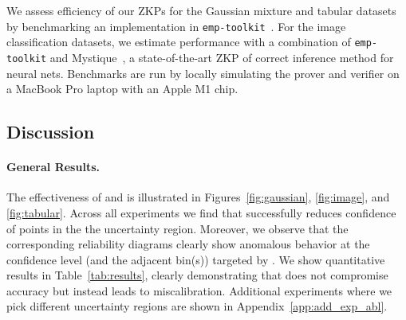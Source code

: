  We assess efficiency of our ZKPs for the Gaussian mixture and tabular datasets by benchmarking an implementation in \texttt{emp-toolkit}~\cite{emp-toolkit}. For the image classification datasets, we estimate performance with a combination of \texttt{emp-toolkit} and Mystique~\cite{weng2021mystique}, a state-of-the-art ZKP of correct inference method for neural nets. Benchmarks are run by locally simulating the prover and verifier on a MacBook Pro laptop with an Apple M1 chip.

\subsection{Discussion}

\paragraph{General Results.}

The effectiveness of \attack and \name is illustrated in Figures~\ref{fig:gaussian}, \ref{fig:image}, and \ref{fig:tabular}. Across all experiments we find that \attack successfully reduces confidence of points in the the uncertainty region. Moreover, we observe that the corresponding reliability diagrams clearly show anomalous behavior at the confidence level (and the adjacent bin(s)) targeted by \attack. We show quantitative results in Table~\ref{tab:results}, clearly demonstrating that \attack does not compromise accuracy but instead leads to miscalibration. Additional experiments where we pick different uncertainty regions are shown in Appendix~\ref{app:add_exp_abl}.

